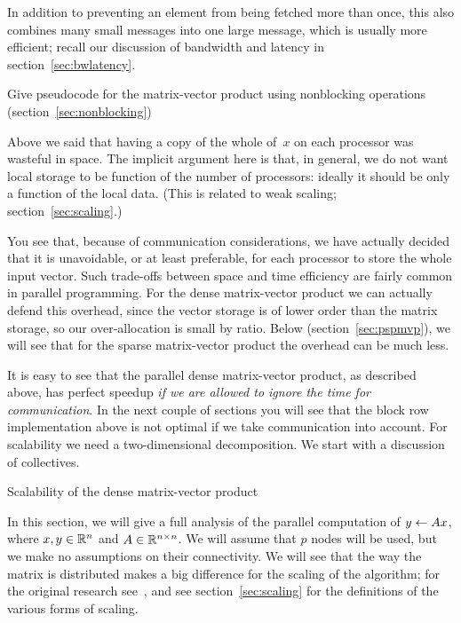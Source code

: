 In addition to preventing an element from being fetched more than
once, this also combines many small messages into one large message,
which is usually more efficient; recall our discussion of bandwidth
and latency in section~\ref{sec:bwlatency}.

\begin{exercise}
  Give pseudocode for the matrix-vector product using 
  nonblocking operations (section~\ref{sec:nonblocking})
\end{exercise}

Above we said that having a copy of the whole of~$x$ on each processor
was wasteful in space. The implicit argument here is that, in general,
we do not want local storage to be function of the number of
processors: ideally it should be only a function of the local
data. (This is related to weak scaling; section~\ref{sec:scaling}.)

You see that, because of communication considerations, we have
actually decided that it is unavoidable, or at least preferable, for
each processor to store the whole input vector.  Such trade-offs
between space and time efficiency are fairly common in parallel
programming. For the dense matrix-vector product we can actually
defend this overhead, since the vector storage is of lower order than
the matrix storage, so our over-allocation is small by ratio. Below
(section~\ref{sec:pspmvp}), we will see that for the sparse
matrix-vector product the overhead can be much less.

It is easy to see that the parallel dense matrix-vector product, as
described above, has perfect speedup \emph{if we are allowed to ignore
the time for communication}. In the next couple of sections you will
see that the block row implementation above is not optimal if we take
communication into account. For scalability we need a two-dimensional
decomposition. We start with a discussion of collectives.

 {Scalability of the dense matrix-vector product}
\label{sec:densescaling}



In this section, we will give a full analysis of the parallel
computation of $ y \leftarrow A x $, where $ x, y \in \mathbb{R}^{n} $ and $ A \in
\mathbb{R}^{n \times n} $.  We will assume that $ p $ nodes will be used, but we make no
assumptions on their connectivity. We will see that the way the matrix
is distributed makes a big difference for the scaling of the
algorithm; for the original research
see~\cite{HeWo:94,Schreiber:scalability92,Stewart90}, and see
section~\ref{sec:scaling} for the definitions of the various forms of
scaling.

